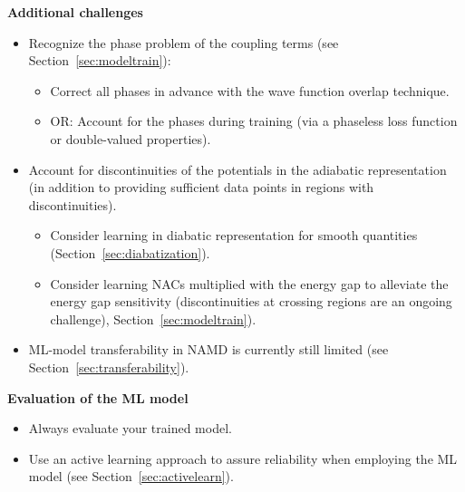 \documentclass[9pt,bestpractices]{livecoms}
\begin{document}
\begin{Checklists*}[p!]
\begin{checklist}

\textbf{Additional challenges}
\begin{itemize}
\item Recognize the phase problem of the coupling terms (see Section~\ref{sec:modeltrain}):%
\begin{itemize}
\item Correct all phases in advance with the wave function overlap technique.
\item OR: Account for the phases during training (via a phaseless loss function or double-valued properties).
\end{itemize}
\item Account for discontinuities of the potentials in the adiabatic representation (in addition to providing sufficient data points in regions with discontinuities).
\begin{itemize}
\item Consider learning in diabatic representation for smooth quantities 
(Section~\ref{sec:diabatization}).
\item Consider learning NACs multiplied with the energy gap to alleviate the energy gap sensitivity (discontinuities at crossing regions are an ongoing challenge), Section~\ref{sec:modeltrain}).
\end{itemize}
\item ML-model transferability in NAMD is currently still limited (see Section~\ref{sec:transferability}).
\end{itemize}

\textbf{Evaluation of the ML model}
\begin{itemize}
\item Always evaluate your trained model.
\item Use an active learning approach to assure reliability when employing the ML model (see Section~\ref{sec:activelearn}).
\end{itemize}
\end{checklist}




\end{Checklists*}
\end{document}
